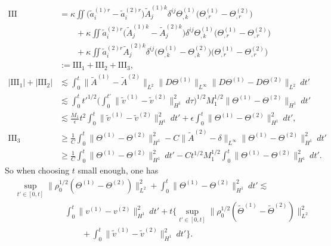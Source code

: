 \documentclass[12pt,a4paper]{amsart}
\numberwithin{equation}{section}
\theoremstyle{plain}
\theoremstyle{definition}
\begin{document}
\begin{align*}
\mathrm{III}&=\kappa\iint \Big(\widetilde{a}^{(1)r}_i-\widetilde{a}^{(2)r}_i\Big)\widetilde{A}^{(1)k}_j \delta^{ij} \Theta^{(1)}_{,k}\Big( \Theta^{(1)}_{,r}-\Theta^{(2)}_{,r}\Big)\\
 &\qquad+\kappa\iint \widetilde{a}^{(2)r}_i\Big(\widetilde{A}^{(1)k}_j -\widetilde{A}^{(2)k}_j \Big)\delta^{ij} \Theta^{(1)}_{,k}\Big( \Theta^{(1)}_{,r}-\Theta^{(2)}_{,r}\Big)\\
 &\qquad+\kappa\iint \widetilde{a}^{(2)r}_i\widetilde{A}^{(2)k}_j \delta^{ij} \Big( \Theta^{(1)}_{,k}- \Theta^{(2)}_{,k}\Big)\Big( \Theta^{(1)}_{,r}-\Theta^{(2)}_{,r}\Big)\\
&:=\mathrm{III}_1+\mathrm{III}_2+\mathrm{III}_3,\\
|\mathrm{III}_1|+|\mathrm{III}_2|&\lesssim \int_{0}^{t} \|\widetilde{A}^{(1)}-\widetilde{A}^{(2)}\|_{L^2} \|D\Theta^{(1)}\|_{L^{\infty}} \|D\Theta^{(1)}-D\Theta^{(2)}\|_{L^2} \ dt'\\
 &\lesssim \int_{0}^{t} t'^{1/2} \Big(\int_{0}^{t'} \|\widetilde{v}^{(1)}-\widetilde{v}^{(2)}\|_{H^1}^2\ d\tau \Big)^{1/2} M_1^{1/2} \|\Theta^{(1)}-\Theta^{(2)}\|_{H^1} \ dt'\\
&\lesssim \frac{M_1}{\epsilon}t^2\int_{0}^{t} \|\widetilde{v}^{(1)}-\widetilde{v}^{(2)}\|_{H^1}^2 \ dt' +\epsilon\int_{0}^{t} \|\Theta^{(1)}-\Theta^{(2)}\|_{H^1}^2 \ dt',\\
\mathrm{III}_3&\geq \frac{1}{C}\int_{0}^{t} \|\Theta^{(1)}-\Theta^{(2)}\|_{H^1}^2-
C\|\widetilde{A}^{(2)}-\delta\|_{L^{\infty}}\|\Theta^{(1)}-\Theta^{(2)}\|_{H^1}^2 \ dt' \\
&\geq \frac{1}{C}\int_{0}^{t} \|\Theta^{(1)}-\Theta^{(2)}\|_{H^1}^2\ dt'-C t^{1/2}M_1^{1/2}\int_{0}^{t}\|\Theta^{(1)}-\Theta^{(2)}\|_{H^1}^2 \ dt'. 
\end{align*}
So when choosing $t$ small enough, one has
\begin{equation}\label{contraction2}
\begin{aligned}
&\sup\limits_{t'\in[0,t]}\|\rho_{0}^{1/2}(\Theta^{(1)}-\Theta^{(2)})\|_{L^{2}}^2+\int_{0}^{t} \|\Theta^{(1)}-\Theta^{(2)}\|_{H^1}^2\ dt'\lesssim\\
&\qquad\qquad\qquad \int_{0}^{t} \|v^{(1)}-v^{(2)}\|_{H^1}^2\ dt'+ t\Big\{\sup\limits_{t'\in[0,t]}\|\rho_{0}^{1/2}(\widetilde{\Theta}^{(1)}-\widetilde{\Theta}^{(2)})\|_{L^{2}}^2\\&\qquad\qquad\qquad\qquad+\int_{0}^{t} \|\widetilde{v}^{(1)}-\widetilde{v}^{(2)}\|_{H^1}^2\ dt'\Big\}.
\end{aligned}
\end{equation}
\end{document}
